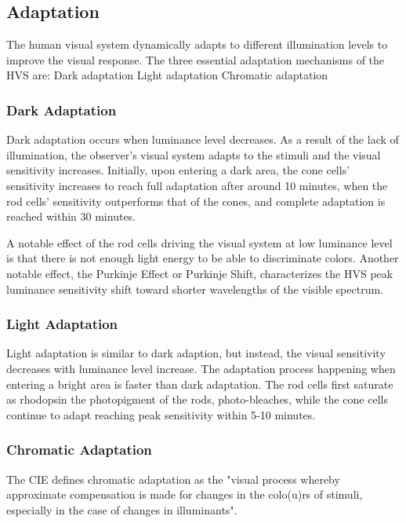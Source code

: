\subsection{Adaptation}

The human visual system dynamically adapts to different illumination levels to improve the visual response. The three essential adaptation mechanisms of the HVS are:
Dark adaptation
Light adaptation
Chromatic adaptation

\subsubsection{Dark Adaptation}

Dark adaptation occurs when luminance level decreases. As a result of the lack of illumination, the observer’s visual system adapts to the stimuli and the visual sensitivity increases. Initially, upon entering a dark area, the cone cells’ sensitivity increases to reach full adaptation after around 10 minutes, when the rod cells’ sensitivity outperforms that of the cones, and complete adaptation is reached within 30 minutes.

A notable effect of the rod cells driving the visual system at low luminance level is that there is not enough light energy to be able to discriminate colors. Another notable effect,  the Purkinje Effect or Purkinje Shift, characterizes the HVS peak luminance sensitivity shift toward shorter wavelengths of the visible spectrum.

\subsubsection{Light Adaptation}

Light adaptation is similar to dark adaption, but instead, the visual sensitivity decreases with luminance level increase. The adaptation process happening when entering a bright area is faster than dark adaptation. The rod cells first saturate as rhodopsin the photopigment of the rods, photo-bleaches, while the cone cells continue to adapt reaching peak sensitivity within 5-10 minutes.

\subsubsection{Chromatic Adaptation}

The CIE defines chromatic adaptation as the "visual process whereby approximate compensation is made for changes in the colo(u)rs of stimuli, especially in the case of changes in illuminants".

